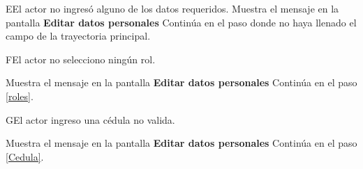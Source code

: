 \begin{UCtrayectoriaA}{E}{El actor no ingresó alguno de los datos requeridos.}
	\UCpaso[\UCsist] Muestra el mensaje  en la pantalla \textbf{Editar datos personales}
	\UCpaso[] Continúa en el paso donde no haya llenado el campo de la trayectoria principal.
\end{UCtrayectoriaA}

\begin{UCtrayectoriaA}{F}{El actor no selecciono ningún rol.}
	
	\UCpaso[\UCsist] Muestra el mensaje en la pantalla \textbf{Editar datos personales}
	\UCpaso[] Continúa en el paso \ref{roles}.
	
\end{UCtrayectoriaA}


\begin{UCtrayectoriaA}{G}{El actor ingreso una cédula no valida.}
	
	\UCpaso[\UCsist] Muestra el mensaje en la pantalla \textbf{Editar datos personales}
	\UCpaso[] Continúa en el paso \ref{Cedula}.
	
\end{UCtrayectoriaA}
 



 

